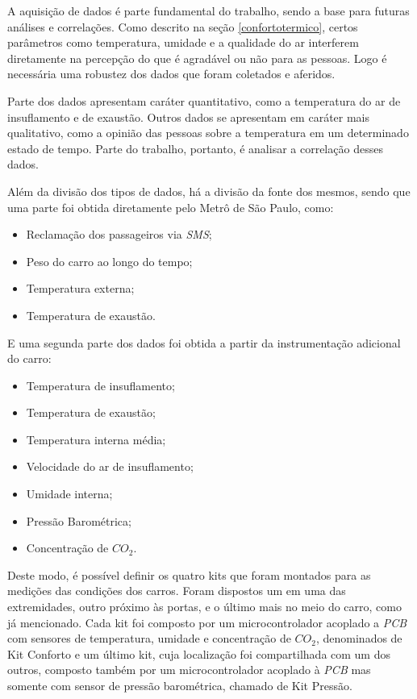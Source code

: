 \documentclass[acronym,symbols,table]{fei}
\begin{document}
A aquisição de dados é parte fundamental do trabalho, sendo a base para futuras análises e correlações. Como descrito na seção \ref{confortotermico}, certos parâmetros como temperatura, umidade e a qualidade do ar interferem diretamente na percepção do que é agradável ou não para as pessoas. Logo é necessária uma robustez dos dados que foram coletados e aferidos.

Parte dos dados apresentam caráter quantitativo, como a temperatura do ar de insuflamento e de exaustão. Outros dados se apresentam em caráter mais qualitativo, como a opinião das pessoas sobre a temperatura em um determinado estado de tempo. Parte do trabalho, portanto, é analisar a correlação desses dados.

Além da divisão dos tipos de dados, há a divisão da fonte dos mesmos, sendo que uma parte foi obtida diretamente pelo Metrô de São Paulo, como:

\begin{itemize}
    \item Reclamação dos passageiros via \textit{SMS};
    \item Peso do carro ao longo do tempo;
    \item Temperatura externa;
    \item Temperatura de exaustão.
\end{itemize}    

E uma segunda parte dos dados foi obtida a partir da instrumentação adicional do carro:

\begin{itemize}
    \item Temperatura de insuflamento;
    \item Temperatura de exaustão;
    \item Temperatura interna média;   
    \item Velocidade do ar de insuflamento;
    \item Umidade interna; 
    \item Pressão Barométrica;
    \item Concentração de $CO_2$. 
\end{itemize}    

Deste modo, é possível definir os quatro kits que foram montados para as medições das condições dos carros. Foram dispostos um em uma das extremidades, outro próximo às portas, e o último mais no meio do carro, como já mencionado. Cada kit foi composto por um microcontrolador acoplado a \textit{PCB} com sensores de temperatura, umidade e concentração de $CO_2$, denominados de Kit Conforto e um último kit, cuja localização foi compartilhada com um dos outros, composto também por um microcontrolador acoplado à \textit{PCB} mas somente com sensor de pressão barométrica, chamado de Kit Pressão.
\end{document}

